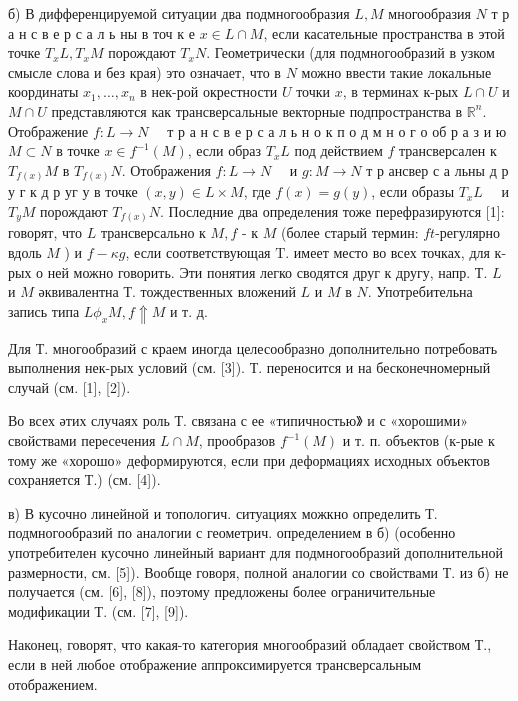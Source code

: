 \documentclass[10pt]{article}
\begin{document}
б) В дифференцируемой ситуации два подмногообразия $L, M$ многообразия $N$ т р а н с в е р с а л ь ны в точ к е $x \in L \cap M$, если касательные пространства в этой точке $T_{x} L, T_{x} M$ порождают $T_{x} N$. Геометрически (для подмногообразий в узком смысле слова и без края) это означает, что в $N$ можно ввести такие локальные координаты $x_{1}, \ldots, x_{n}$ в нек-рой окрестности $U$ точки $x$, в терминах к-рых $L \cap U$ и $M \cap U$ представляются как трансверсальные векторные подпространства в $\mathbb{R}^{n}$. Отображение $f: L \rightarrow N \quad$ т р а н с в е р с а л ь н о к п о д м н о г о об р а з и ю $M \subset N$ в точке $x \in f^{-1}(M)$, если образ $T_{x} L$ под действием $f$ трансверсален к $T_{f(x)} M$ в $T_{f(x)} N$. Отображения $f: L \rightarrow N \quad$ и $g: M \rightarrow N$ т р ансвер с а льны д р у г к д р уг у в точке $(x, y) \in L \times M$, где $f(x)=g(y)$, если образы $T_{x} L \quad$ и $T_{y} M$ порождают $T_{f(x)} N$. Последние два определения тоже перефразируются [1]: говорят, что $L$ трансверсально к $M, f$ - к $M$ (более старый термин: $f t$-регулярно вдоль $M$ ) и $f-\kappa g$, если соответствующая $\mathrm{T}$. имеет место во всех точках, для к-рых о ней можно говорить. Эти понятия легко сводятся друг к другу, напр. Т. $L$ и $M$ әквивалентна Т. тождественных вложений $L$ и $M$ в $N$. Употребительна запись типа $L \phi_{x} M, f \Uparrow M$ и т. д.



Для Т. многообразий с краем иногда целесообразно дополнительно потребовать выполнения нек-рых условий (см. [3]). Т. переносится и на бесконечномерный случай (см. [1], [2]).



Во всех әтих случаях роль Т. связана с ее «типичностью》 и с «хорошими» свойствами пересечения $L \cap M$, прообразов $f^{-1}(M)$ и т. п. объектов (к-рые к тому же «хорошо» деформируются, если при деформациях исходных объектов сохраняется Т.) (см. [4]).



в) В кусочно линейной и топологич. ситуациях можкно определить Т. подмногообразий по аналогии с геометрич. определением в б) (особенно употребителен кусочно линейный вариант для подмногообразий дополнительной размерности, см. [5]). Вообще говоря, полной аналогии со свойствами Т. из б) не получается (см. [6], [8]), поэтому предложены более ограничительные модификации Т. (см. [7], [9]).



Наконец, говорят, что какая-то категория многообразий обладает свойством Т., если в ней любое отображение аппроксимируется трансверсальным отображением.
\end{document}
